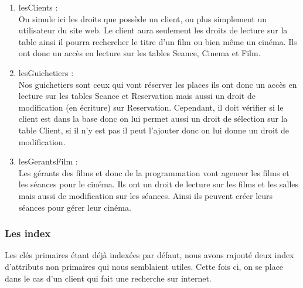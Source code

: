 \documentclass[a4paper,sffamily,12pt]{article}
\begin{document}
					\begin{enumerate}[label=\ding{228}]

						\item lesClients : \\
						
							On simule ici les droits que possède un client, ou plus simplement un utilisateur du site web. Le client aura seulement les droits de lecture sur la table ainsi il pourra rechercher le titre d'un film ou bien même un cinéma. Ils ont donc un accès en lecture sur les tables Seance, Cinema et Film.\\
																		
						\item lesGuichetiers : \\
						
							Nos guichetiers sont ceux qui vont réserver les places ils ont donc un accès en lecture sur les tables Seance et Reservation mais aussi un droit de modification (en écriture) sur Reservation. Cependant, il doit vérifier si le client est dans la base donc on lui permet aussi un droit de sélection sur la table Client, si il n'y est pas il peut l'ajouter donc on lui donne un droit de modification.\\
						
						\item lesGerantsFilm : \\
							
							Les gérants des films et donc de la programmation vont agencer les films et les séances pour le cinéma. Ils ont un droit de lecture sur les films et les salles mais aussi de modification sur les séances. Ainsi ils peuvent créer leurs séances pour gérer leur cinéma.\\
																													
					\end{enumerate}
					
				\subsubsection{Les index}
				
					\vspace{0.5cm}
					
					Les clés primaires étant déjà indexées par défaut, nous avons rajouté deux index d'attributs non primaires qui nous semblaient utiles. Cette fois ci, on se place dans le cas d'un client qui fait une recherche sur internet. \\ 					
					
\end{document}
